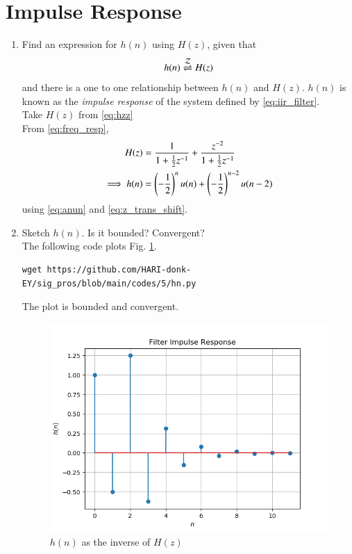 \documentclass[journal,12pt,twocolumn]{IEEEtran}
\renewcommand\thesection{\arabic{section}}
\begin{document}
\section{Impulse Response}
\begin{enumerate}[label=\thesection.\arabic*]

\item \label{prob:impulse_resp}
Find an expression for $h(n)$ using $H(z)$, given that 
\begin{equation}
\label{eq:impulse_resp}
h(n) \overset{\mathcal{Z}}{ \rightleftharpoons} H(z)
\end{equation}
and there is a one to one relationship between $h(n)$ and $H(z)$. $h(n)$ is known as the {\em impulse response} of the
system defined by \eqref{eq:iir_filter}.\\Take $H(z)$ from \eqref{eq:hzz}
\\
\solution From \eqref{eq:freq_resp},
\begin{align}
H(z) &= \frac{1}{1 + \frac{1}{2}z^{-1}} + \frac{ z^{-2}}{1 + \frac{1}{2}z^{-1}}
\\
\implies h(n) &= \left(-\frac{1}{2}\right)^{n}u(n) + \left(-\frac{1}{2}\right)^{n-2}u(n-2)
\end{align}
using \eqref{eq:anun} and \eqref{eq:z_trans_shift}.

\item Sketch $h(n)$. Is it bounded? Convergent? 
\\
\solution The following code plots Fig. \ref{fig:hn}.
\begin{lstlisting}
wget https://github.com/HARI-donk-EY/sig_pros/blob/main/codes/5/hn.py
\end{lstlisting}
The plot is bounded and convergent.\\
\begin{figure}[!ht]
\centering
\includegraphics[width=\columnwidth]{./figs/hn}
\caption{$h(n)$ as the inverse of $H(z)$}
\label{fig:hn}
\end{figure}


\end{enumerate}
\end{document}
